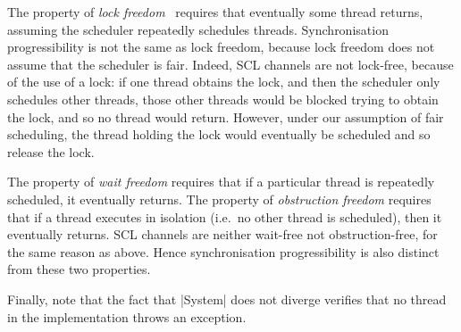 The property of \emph{lock freedom}~\cite{Herlihy-Shavit} requires that
eventually some thread returns, assuming the scheduler repeatedly schedules
threads.  Synchronisation progressibility is not the same as lock freedom,
because lock freedom does not assume that the scheduler is fair.  Indeed, SCL
channels are not lock-free, because of the use of a lock: if one thread
obtains the lock, and then the scheduler only schedules other threads, those
other threads would be blocked trying to obtain the lock, and so no thread
would return.  However, under our assumption of fair scheduling, the thread
holding the lock would eventually be scheduled and so release the lock.

The property of \emph{wait freedom} requires that if a particular thread is
repeatedly scheduled, it eventually returns.  The property of
\emph{obstruction freedom} requires that if a thread executes in isolation
(i.e.~no other thread is scheduled), then it eventually returns.  SCL channels
are neither wait-free not obstruction-free, for the same reason as above.
Hence synchronisation progressibility is also distinct from these two
properties.



Finally, note that the fact that |System| does not diverge verifies that no
thread in the implementation throws an exception. 

